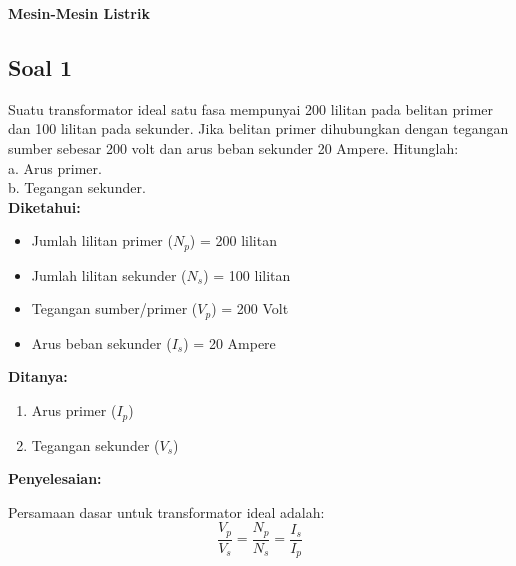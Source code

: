 \documentclass[12pt, a4paper]{article}
\begin{document}
\pagestyle{empty}

\begin{center}
\Large\textbf{Mesin-Mesin Listrik}
\end{center}

\subsection*{Soal 1}
Suatu transformator ideal satu fasa mempunyai 200 lilitan pada belitan primer dan 100 lilitan pada sekunder. Jika belitan primer dihubungkan dengan tegangan sumber sebesar 200 volt dan arus beban sekunder 20 Ampere. Hitunglah:\\
a. Arus primer.\\
b. Tegangan sekunder.\\

\textbf{Diketahui:}
\begin{itemize}
    \item Jumlah lilitan primer ($N_p$) = 200 lilitan
    \item Jumlah lilitan sekunder ($N_s$) = 100 lilitan
    \item Tegangan sumber/primer ($V_p$) = 200 Volt
    \item Arus beban sekunder ($I_s$) = 20 Ampere
\end{itemize}

\textbf{Ditanya:}
\begin{enumerate}[label=\alph*.]
    \item Arus primer ($I_p$)
    \item Tegangan sekunder ($V_s$)
\end{enumerate}

\textbf{Penyelesaian:}

Persamaan dasar untuk transformator ideal adalah:
\[
    \frac{V_p}{V_s} = \frac{N_p}{N_s} = \frac{I_s}{I_p}
\]
\end{document}
